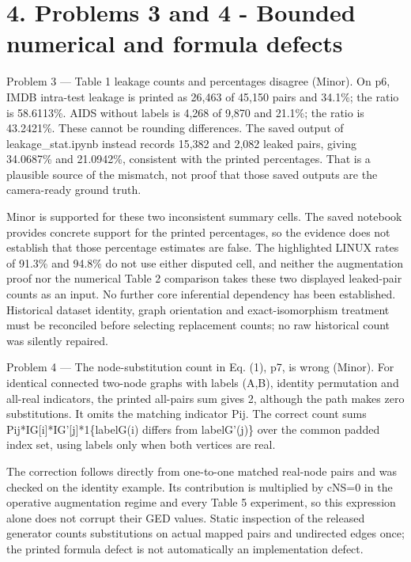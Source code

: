 \documentclass[10pt]{article}
\begin{document}
\section*{4. Problems 3 and 4 - Bounded numerical and formula defects}
Problem 3 — Table 1 leakage counts and percentages disagree (Minor). On p6, IMDB intra-test leakage is printed as 26,463 of 45,150 pairs and 34.1\%; the ratio is 58.6113\%. AIDS without labels is 4,268 of 9,870 and 21.1\%; the ratio is 43.2421\%. These cannot be rounding differences. The saved output of leakage\_stat.ipynb instead records 15,382 and 2,082 leaked pairs, giving 34.0687\% and 21.0942\%, consistent with the printed percentages. That is a plausible source of the mismatch, not proof that those saved outputs are the camera-ready ground truth.\par
Minor is supported for these two inconsistent summary cells. The saved notebook provides concrete support for the printed percentages, so the evidence does not establish that those percentage estimates are false. The highlighted LINUX rates of 91.3\% and 94.8\% do not use either disputed cell, and neither the augmentation proof nor the numerical Table 2 comparison takes these two displayed leaked-pair counts as an input. No further core inferential dependency has been established. Historical dataset identity, graph orientation and exact-isomorphism treatment must be reconciled before selecting replacement counts; no raw historical count was silently repaired.\par
Problem 4 — The node-substitution count in Eq. (1), p7, is wrong (Minor). For identical connected two-node graphs with labels (A,B), identity permutation and all-real indicators, the printed all-pairs sum gives 2, although the path makes zero substitutions. It omits the matching indicator Pij. The correct count sums Pij*IG[i]*IG’[j]*1\{labelG(i) differs from labelG’(j)\} over the common padded index set, using labels only when both vertices are real.\par
The correction follows directly from one-to-one matched real-node pairs and was checked on the identity example. Its contribution is multiplied by cNS=0 in the operative augmentation regime and every Table 5 experiment, so this expression alone does not corrupt their GED values. Static inspection of the released generator counts substitutions on actual mapped pairs and undirected edges once; the printed formula defect is not automatically an implementation defect.\par
\end{document}
